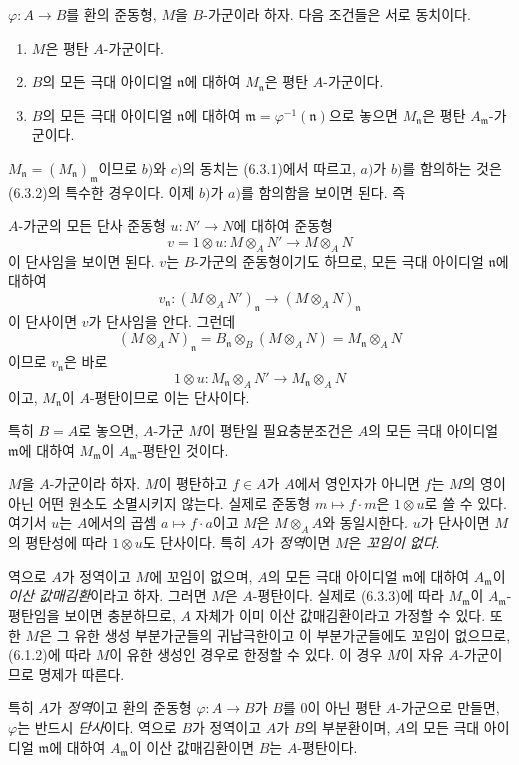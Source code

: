 \begin{env}[6.3.3]
\label{0.6.3.3-ko}
$\varphi:A\to B$를 환의 준동형, $M$을 $B$-가군이라 하자.
다음 조건들은 서로 동치이다.
\begin{enumerate}
  \item[$a)$] $M$은 평탄 $A$-가군이다.
  \item[$b)$] $B$의 모든 극대 아이디얼 $\mathfrak n$에 대하여
    $M_\mathfrak n$은 평탄 $A$-가군이다.
  \item[$c)$] $B$의 모든 극대 아이디얼 $\mathfrak n$에 대하여
    $\mathfrak m=\varphi^{-1}(\mathfrak n)$으로 놓으면
    $M_\mathfrak n$은 평탄 $A_\mathfrak m$-가군이다.
\end{enumerate}

$M_\mathfrak n=(M_\mathfrak n)_\mathfrak m$이므로 $b)$와 $c)$의
동치는 (6.3.1)에서 따르고, $a)$가 $b)$를 함의하는 것은 (6.3.2)의
특수한 경우이다. 이제 $b)$가 $a)$를 함의함을 보이면 된다. 즉


$A$-가군의 모든 단사 준동형 $u:N'\to N$에 대하여 준동형
\[
  v=1\otimes u:M\otimes_A N'\longrightarrow M\otimes_A N
\]
이 단사임을 보이면 된다. $v$는 $B$-가군의 준동형이기도 하므로,
모든 극대 아이디얼 $\mathfrak n$에 대하여
\[
  v_\mathfrak n:(M\otimes_A N')_\mathfrak n
  \longrightarrow(M\otimes_A N)_\mathfrak n
\]
이 단사이면 $v$가 단사임을 안다. 그런데
\[
  (M\otimes_A N)_\mathfrak n
  =B_\mathfrak n\otimes_B(M\otimes_A N)
  =M_\mathfrak n\otimes_A N
\]
이므로 $v_\mathfrak n$은 바로
\[
  1\otimes u:M_\mathfrak n\otimes_A N'
  \longrightarrow M_\mathfrak n\otimes_A N
\]
이고, $M_\mathfrak n$이 $A$-평탄이므로 이는 단사이다.

특히 $B=A$로 놓으면, $A$-가군 $M$이 평탄일 필요충분조건은
$A$의 모든 극대 아이디얼 $\mathfrak m$에 대하여
$M_\mathfrak m$이 $A_\mathfrak m$-평탄인 것이다.
\end{env}

\begin{env}[6.3.4]
\label{0.6.3.4-ko}
$M$을 $A$-가군이라 하자. $M$이 평탄하고 $f\in A$가 $A$에서
영인자가 아니면 $f$는 $M$의 영이 아닌 어떤 원소도 소멸시키지
않는다. 실제로 준동형 $m\mapsto f\cdot m$은 $1\otimes u$로
쓸 수 있다. 여기서 $u$는 $A$에서의 곱셈
$a\mapsto f\cdot a$이고 $M$은 $M\otimes_A A$와 동일시한다.
$u$가 단사이면 $M$의 평탄성에 따라 $1\otimes u$도 단사이다.
특히 $A$가 \emph{정역}이면 $M$은 \emph{꼬임이 없다}.

역으로 $A$가 정역이고 $M$에 꼬임이 없으며, $A$의 모든 극대
아이디얼 $\mathfrak m$에 대하여 $A_\mathfrak m$이
\emph{이산 값매김환}이라고 하자. 그러면 $M$은 $A$-평탄이다.
실제로 (6.3.3)에 따라 $M_\mathfrak m$이
$A_\mathfrak m$-평탄임을 보이면 충분하므로, $A$ 자체가 이미
이산 값매김환이라고 가정할 수 있다. 또한 $M$은 그 유한 생성
부분가군들의 귀납극한이고 이 부분가군들에도 꼬임이 없으므로,
(6.1.2)에 따라 $M$이 유한 생성인 경우로 한정할 수 있다.
이 경우 $M$이 자유 $A$-가군이므로 명제가 따른다.

특히 $A$가 \emph{정역}이고 환의 준동형
$\varphi:A\to B$가 $B$를 $0$이 아닌 평탄 $A$-가군으로 만들면,
$\varphi$는 반드시 \emph{단사}이다. 역으로 $B$가 정역이고
$A$가 $B$의 부분환이며, $A$의 모든 극대 아이디얼
$\mathfrak m$에 대하여 $A_\mathfrak m$이 이산 값매김환이면
$B$는 $A$-평탄이다.
\end{env}

